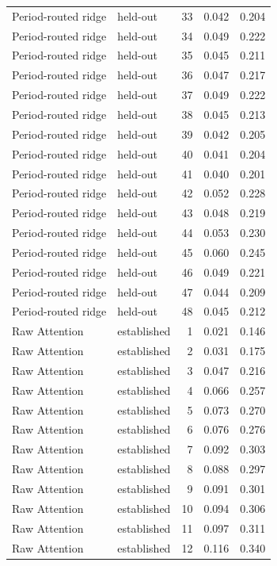 \begin{tabular}{llrrr}
Period-routed ridge & held-out & 33 & 0.042 & 0.204 \\
Period-routed ridge & held-out & 34 & 0.049 & 0.222 \\
Period-routed ridge & held-out & 35 & 0.045 & 0.211 \\
Period-routed ridge & held-out & 36 & 0.047 & 0.217 \\
Period-routed ridge & held-out & 37 & 0.049 & 0.222 \\
Period-routed ridge & held-out & 38 & 0.045 & 0.213 \\
Period-routed ridge & held-out & 39 & 0.042 & 0.205 \\
Period-routed ridge & held-out & 40 & 0.041 & 0.204 \\
Period-routed ridge & held-out & 41 & 0.040 & 0.201 \\
Period-routed ridge & held-out & 42 & 0.052 & 0.228 \\
Period-routed ridge & held-out & 43 & 0.048 & 0.219 \\
Period-routed ridge & held-out & 44 & 0.053 & 0.230 \\
Period-routed ridge & held-out & 45 & 0.060 & 0.245 \\
Period-routed ridge & held-out & 46 & 0.049 & 0.221 \\
Period-routed ridge & held-out & 47 & 0.044 & 0.209 \\
Period-routed ridge & held-out & 48 & 0.045 & 0.212 \\
Raw Attention & established & 1 & 0.021 & 0.146 \\
Raw Attention & established & 2 & 0.031 & 0.175 \\
Raw Attention & established & 3 & 0.047 & 0.216 \\
Raw Attention & established & 4 & 0.066 & 0.257 \\
Raw Attention & established & 5 & 0.073 & 0.270 \\
Raw Attention & established & 6 & 0.076 & 0.276 \\
Raw Attention & established & 7 & 0.092 & 0.303 \\
Raw Attention & established & 8 & 0.088 & 0.297 \\
Raw Attention & established & 9 & 0.091 & 0.301 \\
Raw Attention & established & 10 & 0.094 & 0.306 \\
Raw Attention & established & 11 & 0.097 & 0.311 \\
Raw Attention & established & 12 & 0.116 & 0.340 \\

\end{tabular}
